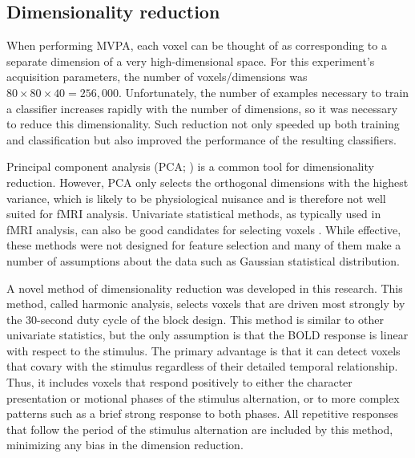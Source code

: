 \documentclass[5p,authoryear]{elsarticle}
\begin{document}
\subsection{Dimensionality reduction}
When performing MVPA, each voxel can be thought of as corresponding to a separate dimension of a very high-dimensional space.
For this experiment's acquisition parameters, the number of voxels/dimensions was $80 \times 80 \times 40 = 256,000$.
Unfortunately, the number of examples necessary to train a classifier increases rapidly with the number of dimensions, so it was necessary to reduce this dimensionality.
Such reduction not only speeded up both training and classification but also improved the performance of the resulting classifiers.

Principal component analysis (PCA; \cite{Hotelling1933}) is a common tool for dimensionality reduction.
However, PCA only selects the orthogonal dimensions with the highest variance, which is likely to be physiological nuisance and is therefore not well suited for fMRI analysis.
Univariate statistical methods, as typically used in  fMRI analysis, can also be good candidates for selecting voxels \citep{Norman2006,Pereira2009}.
While effective, these methods were not designed for feature selection and many of them make a number of assumptions about the data such as Gaussian statistical distribution.

A novel method of dimensionality reduction was developed in this research.
This method, called harmonic analysis, selects voxels that are driven most strongly by the 30-second duty cycle of the block design.
This method is similar to other univariate statistics, but the only assumption is that the BOLD response is linear with respect to the stimulus.
The primary advantage is that it can detect voxels that covary with the stimulus regardless of their detailed temporal relationship. 
Thus, it includes voxels that respond positively to either the character presentation or motional phases of the stimulus alternation, or to more complex patterns such as a brief strong response to both phases. 
All repetitive responses that follow the period of the stimulus alternation are included by this method, minimizing any bias in the dimension reduction.
\end{document}
